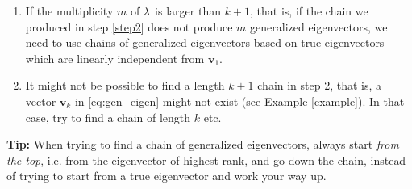 \documentclass[12pt]{article}
\newcommand{\bv}{\mathbf{v}}
\newcommand{\NI}{\noindent}
\begin{document}
\begin{enumerate}
		

	\item If the multiplicity $m$ of $\lambda$ is larger than $k+1$, that is, if the chain we produced in step \ref{step2} does not produce $m$ generalized eigenvectors, we need to use chains of generalized eigenvectors based on true eigenvectors which are linearly independent from $\bv_1$.


	\item It might not be possible to find a length $k+1$ chain in step 2, that is, a vector $\bv_k$ in \eqref{eq:gen_eigen} might not exist (see Example \ref{example}). 
	In that case, try to find a chain of length $k$ etc. 



\end{enumerate}

\NI \textbf{Tip:} When trying to find a chain of generalized eigenvectors, always start \emph{from the top}, i.e. from the eigenvector of highest rank, and go down the chain, instead of trying to start from a true eigenvector and work your way up.
\end{document}

